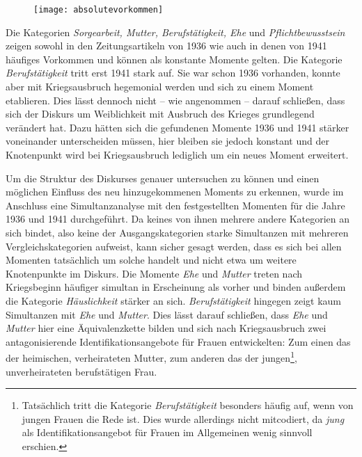 \documentclass[12pt, titlepage=true, toc=bib]{scrartcl}
\begin{document}
{\begin{figure}[htbp] %
\centering
\texttt{[image: absolutevorkommen]}%
\end{figure}
 
\noindent Die Kategorien \textit{Sorgearbeit, Mutter, Berufstätigkeit, Ehe} und \textit{Pflichtbewusstsein} zeigen sowohl in den Zeitungsartikeln von 1936 wie auch in denen von 1941 häufiges Vorkommen und können als konstante Momente gelten. Die Kategorie \textit{Berufstätigkeit} tritt erst 1941 stark auf. Sie war schon 1936 vorhanden, konnte aber mit Kriegsausbruch hegemonial werden und sich zu einem Moment etablieren. Dies lässt dennoch nicht -- wie angenommen -- darauf schließen, dass sich der Diskurs um Weiblichkeit mit Ausbruch des Krieges grundlegend verändert hat. Dazu hätten sich die gefundenen Momente 1936 und 1941 stärker voneinander unterscheiden müssen, hier bleiben sie jedoch konstant und der Knotenpunkt wird bei Kriegsausbruch lediglich um ein neues Moment erweitert.

Um die Struktur des Diskurses genauer untersuchen zu können und einen möglichen Einfluss des neu hinzugekommenen Moments zu erkennen, wurde im Anschluss eine Simultanzanalyse mit den festgestellten Momenten für die Jahre 1936 und 1941 durchgeführt. Da keines von ihnen mehrere andere Kategorien an sich bindet, also keine der Ausgangskategorien starke Simultanzen mit mehreren Vergleichskategorien aufweist, kann sicher gesagt werden, dass es sich bei allen Momenten tatsächlich um solche handelt und nicht etwa um weitere Knotenpunkte im Diskurs. Die Momente \textit{Ehe} und \textit{Mutter} treten nach Kriegsbeginn häufiger simultan in Erscheinung als vorher und binden außerdem die Kategorie \textit{Häuslichkeit} stärker an sich. \textit{Berufstätigkeit} hingegen zeigt kaum Simultanzen mit \textit{Ehe} und \textit{Mutter}. Dies lässt darauf schließen, dass \textit{Ehe} und \textit{Mutter} hier eine Äquivalenzkette bilden und sich nach Kriegsausbruch zwei antagonisierende Identifikationsangebote für Frauen entwickelten: Zum einen das der heimischen, verheirateten Mutter, zum anderen das der jungen\footnote{Tatsächlich tritt die Kategorie \textit{Berufstätigkeit} besonders häufig auf, wenn von jungen Frauen die Rede ist. Dies wurde allerdings nicht mitcodiert, da \textit{jung} als Identifikationsangebot für Frauen im Allgemeinen wenig sinnvoll erschien.}, unverheirateten berufstätigen Frau. 

}
\end{document}
